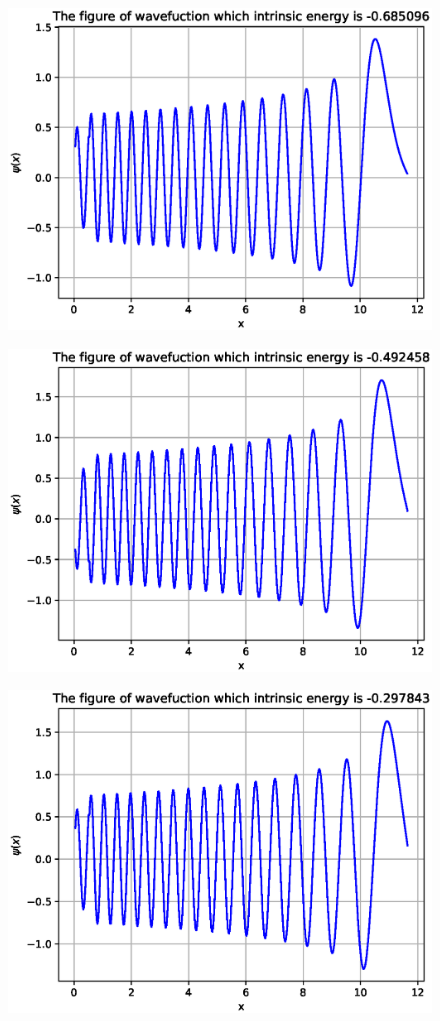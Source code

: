 \documentclass[twoside,twocolumn]{article}
\begin{document}
\begin{CJK*}{UTF8}{gkai}
\begin{figure}
	\label{fig:31}
\end{figure}
\begin{figure}
	\centering
	\includegraphics[width=0.9\linewidth]{figure/32}
	\label{fig:32}
\end{figure}
\begin{figure}
	\centering
	\includegraphics[width=0.9\linewidth]{figure/33}
	\label{fig:33}
\end{figure}
\begin{figure}
	\centering
	\includegraphics[width=0.9\linewidth]{figure/34}

\end{figure}
\end{CJK*}
\end{document}
